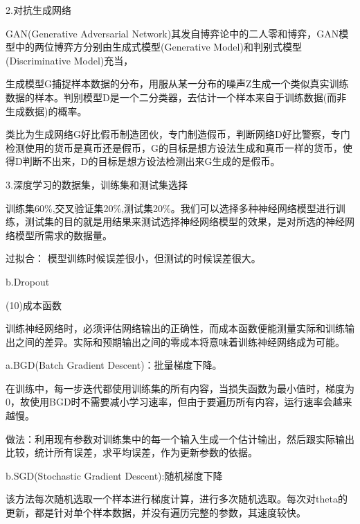 \documentclass[openbib]{article}
\begin{document}
	\begin{center}
		2.对抗生成网络
	\end{center}

	GAN(Generative Adversarial Network)其发自博弈论中的二人零和博弈，GAN模型中的两位博弈方分别由生成式模型(Generative Model)和判别式模型(Discriminative Model)充当，
	
	生成模型G捕捉样本数据的分布，用服从某一分布的噪声Z生成一个类似真实训练数据的样本。判别模型D是一个二分类器，去估计一个样本来自于训练数据(而非生成数据)的概率。
	
	类比为生成网络G好比假币制造团伙，专门制造假币，判断网络D好比警察，专门检测使用的货币是真币还是假币，G的目标是想方设法生成和真币一样的货币，使得D判断不出来，D的目标是想方设法检测出来G生成的是假币。
	
	\begin{center}
		3.深度学习的数据集，训练集和测试集选择
	\end{center}

	训练集60\%,交叉验证集20\%,测试集20\%。我们可以选择多种神经网络模型进行训练，测试集的目的就是用结果来测试选择神经网络模型的效果，是对所选的神经网络模型所需求的数据量。
	
	过拟合： 模型训练时候误差很小，但测试的时候误差很大。
	
	
	
	\begin{center}
		b.Dropout
	\end{center}

	
	
	(10)成本函数
	
	训练神经网络时，必须评估网络输出的正确性，而成本函数便能测量实际和训练输出之间的差异。实际和预期输出之间的零成本将意味着训练神经网络成为可能。
	\begin{center}
		a.BGD(Batch Gradient Descent)：批量梯度下降。	
	\end{center}

	在训练中，每一步迭代都使用训练集的所有内容，当损失函数为最小值时，梯度为0，故使用BGD时不需要减小学习速率，但由于要遍历所有内容，运行速率会越来越慢。
	
	做法：利用现有参数对训练集中的每一个输入生成一个估计输出，然后跟实际输出比较，统计所有误差，求平均误差，作为更新参数的依据。
	
	\begin{center}
		b.SGD(Stochastic Gradient Descent):随机梯度下降
	\end{center}

	该方法每次随机选取一个样本进行梯度计算，进行多次随机选取。每次对theta的更新，都是针对单个样本数据，并没有遍历完整的参数，其速度较快。
	
\end{document}

